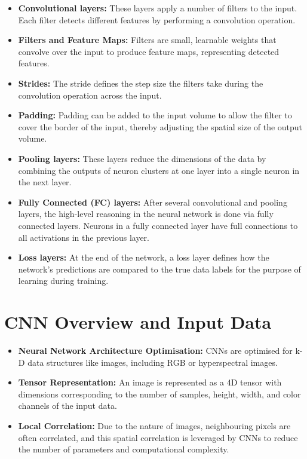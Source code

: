 \begin{itemize}
    \item \textbf{Convolutional layers:} These layers apply a number of filters to the input. Each filter detects different features by performing a convolution operation.
    \item \textbf{Filters and Feature Maps:} Filters are small, learnable weights that convolve over the input to produce feature maps, representing detected features.
    \item \textbf{Strides:} The stride defines the step size the filters take during the convolution operation across the input.
    \item \textbf{Padding:} Padding can be added to the input volume to allow the filter to cover the border of the input, thereby adjusting the spatial size of the output volume.
    \item \textbf{Pooling layers:} These layers reduce the dimensions of the data by combining the outputs of neuron clusters at one layer into a single neuron in the next layer.
    \item \textbf{Fully Connected (FC) layers:} After several convolutional and pooling layers, the high-level reasoning in the neural network is done via fully connected layers. Neurons in a fully connected layer have full connections to all activations in the previous layer.
    \item \textbf{Loss layers:} At the end of the network, a loss layer defines how the network's predictions are compared to the true data labels for the purpose of learning during training.
\end{itemize}
\section{CNN Overview and Input Data}
\begin{itemize}
    \item \textbf{Neural Network Architecture Optimisation:} CNNs are optimised for k-D data structures like images, including RGB or hyperspectral images.
    \item \textbf{Tensor Representation:} An image is represented as a 4D tensor with dimensions corresponding to the number of samples, height, width, and color channels of the input data.
    \item \textbf{Local Correlation:} Due to the nature of images, neighbouring pixels are often correlated, and this spatial correlation is leveraged by CNNs to reduce the number of parameters and computational complexity.
\end{itemize}



